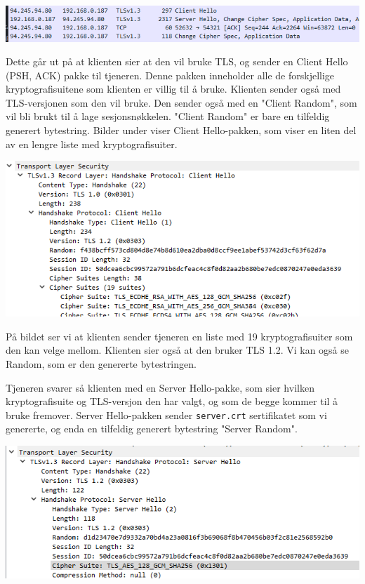 \documentclass[12pt]{article}
\begin{document}
    \begin{center}
        \includegraphics[width=\linewidth]{assets/8kKfzaM.png}
    \end{center}
    
    Dette går ut på at klienten sier at den vil bruke TLS, og sender en Client Hello (PSH, ACK)
    pakke til tjeneren. Denne pakken inneholder alle de forskjellige kryptografisuitene
    som klienten er villig til å bruke. Klienten sender også med TLS-versjonen som den vil bruke.
    Den sender også med en "Client Random", som vil bli brukt til å lage sesjonsnøkkelen. "Client
    Random" er bare en tilfeldig generert bytestring.
    Bilder under viser Client Hello-pakken, som viser en liten del av en lengre liste med kryptografisuiter.

    \begin{center}
        \includegraphics[width=\linewidth]{assets/oXq8RQt.png}
    \end{center}

    På bildet ser vi at klienten sender tjeneren en liste med 19 kryptografisuiter som 
    den kan velge mellom. Klienten sier også at den bruker TLS 1.2. Vi kan også se Random, som 
    er den genererte bytestringen.

    Tjeneren svarer så klienten med en Server Hello-pakke, som sier hvilken kryptografisuite 
    og TLS-versjon den har valgt, og som de begge kommer til å bruke fremover. Server Hello-pakken 
    sender \verb|server.crt| sertifikatet som vi genererte, og enda en tilfeldig generert bytestring 
    "Server Random".

    \begin{center}
        \includegraphics[width=\linewidth]{assets/6GQP3U2.png}
    \end{center}
\end{document}
